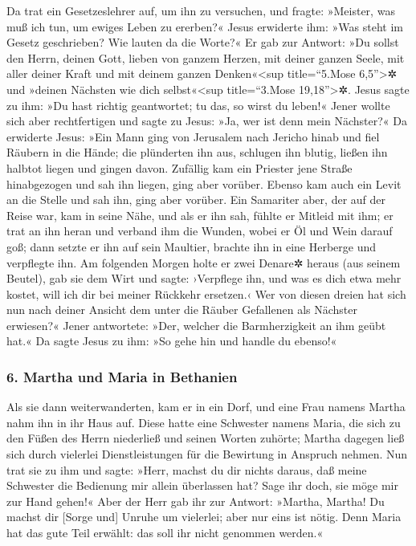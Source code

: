  Da trat ein Gesetzeslehrer auf, um ihn zu versuchen, und
fragte: »Meister, was muß ich tun, um ewiges Leben zu ererben?«
 Jesus erwiderte ihm: »Was steht im Gesetz geschrieben?
Wie lauten da die Worte?«  Er gab zur Antwort: »Du sollst
den Herrn, deinen Gott, lieben von ganzem Herzen, mit deiner ganzen
Seele, mit aller deiner Kraft und mit deinem ganzen Denken«\textless sup
title=``5.Mose 6,5''\textgreater✲ und »deinen Nächsten wie dich
selbst«\textless sup title=``3.Mose 19,18''\textgreater✲.
 Jesus sagte zu ihm: »Du hast richtig geantwortet; tu
das, so wirst du leben!«  Jener wollte sich aber
rechtfertigen und sagte zu Jesus: »Ja, wer ist denn mein Nächster?«
 Da erwiderte Jesus: »Ein Mann ging von Jerusalem nach
Jericho hinab und fiel Räubern in die Hände; die plünderten ihn aus,
schlugen ihn blutig, ließen ihn halbtot liegen und gingen davon.
 Zufällig kam ein Priester jene Straße hinabgezogen und
sah ihn liegen, ging aber vorüber.  Ebenso kam auch ein
Levit an die Stelle und sah ihn, ging aber vorüber.  Ein
Samariter aber, der auf der Reise war, kam in seine Nähe, und als er ihn
sah, fühlte er Mitleid mit ihm;  er trat an ihn heran und
verband ihm die Wunden, wobei er Öl und Wein darauf goß; dann setzte er
ihn auf sein Maultier, brachte ihn in eine Herberge und verpflegte ihn.
 Am folgenden Morgen holte er zwei Denare✲ heraus (aus
seinem Beutel), gab sie dem Wirt und sagte: ›Verpflege ihn, und was es
dich etwa mehr kostet, will ich dir bei meiner Rückkehr ersetzen.‹
 Wer von diesen dreien hat sich nun nach deiner Ansicht
dem unter die Räuber Gefallenen als Nächster erwiesen?« 
Jener antwortete: »Der, welcher die Barmherzigkeit an ihm geübt hat.« Da
sagte Jesus zu ihm: »So gehe hin und handle du ebenso!«

\hypertarget{martha-und-maria-in-bethanien}{%
\subsubsection{6. Martha und Maria in
Bethanien}\label{martha-und-maria-in-bethanien}}

 Als sie dann weiterwanderten, kam er in ein Dorf, und
eine Frau namens Martha nahm ihn in ihr Haus auf.  Diese
hatte eine Schwester namens Maria, die sich zu den Füßen des Herrn
niederließ und seinen Worten zuhörte;  Martha dagegen
ließ sich durch vielerlei Dienstleistungen für die Bewirtung in Anspruch
nehmen. Nun trat sie zu ihm und sagte: »Herr, machst du dir nichts
daraus, daß meine Schwester die Bedienung mir allein überlassen hat?
Sage ihr doch, sie möge mir zur Hand gehen!«  Aber der
Herr gab ihr zur Antwort: »Martha, Martha! Du machst dir {[}Sorge und{]}
Unruhe um vielerlei;  aber nur eins ist nötig. Denn Maria
hat das gute Teil erwählt: das soll ihr nicht genommen werden.«

